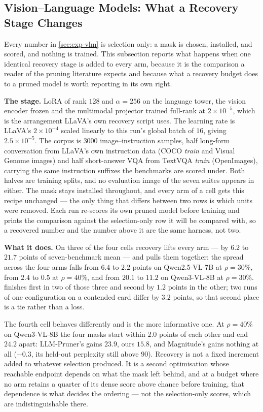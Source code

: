 \subsection{Vision--Language Models: What a Recovery Stage Changes}
\label{app:vlm-recovery}

Every number in \cref{sec:exp-vlm} is selection only: a mask is chosen, installed, and scored, and
nothing is trained. This subsection reports what happens when one identical recovery stage is added
to every arm, because it is the comparison a reader of the pruning literature expects and because
what a recovery budget does to a pruned model is worth reporting in its own right.

\textbf{The stage.} LoRA \citep{hu2022lora} of rank $128$ and $\alpha{=}256$ on the language tower, the vision encoder
frozen and the multimodal projector trained full-rank at $2\times10^{-5}$, which is the arrangement
LLaVA's own recovery script uses. The learning rate is LLaVA's $2\times10^{-4}$ scaled linearly to
this run's global batch of $16$, giving $2.5\times10^{-5}$. The corpus is $3000$ image--instruction
samples, half long-form conversation from LLaVA's own instruction data
\citep{liu2023llava} (COCO \emph{train} and Visual Genome images) and half short-answer VQA from
TextVQA \emph{train} \citep{singh2019textvqa} (OpenImages), carrying the same
instruction suffixes the benchmarks are scored under. Both halves are training splits, and no
evaluation image of the seven suites appears in either. The mask stays installed throughout, and every arm of
a cell gets this recipe unchanged --- the only thing that differs between two rows is which units
were removed. Each run re-scores its own pruned model before training and prints the comparison
against the selection-only row it will be compared with, so a recovered number and the number above
it are the same harness, not two.

\textbf{What it does.} On three of the four cells recovery lifts every arm --- by $6.2$ to $21.7$
points of seven-benchmark mean --- and pulls them together: the spread across the four arms falls
from $6.4$ to $2.2$ points on Qwen2.5-VL-7B at $\rho{=}30\%$, from $2.4$ to $0.5$ at $\rho{=}40\%$,
and from $20.1$ to $11.2$ on Qwen3-VL-8B at $\rho{=}30\%$. \method finishes first in two of those
three and second by $1.2$ points in the other; two runs of one configuration on a contended card
differ by $3.2$ points, so that second place is a tie rather than a loss.

The fourth cell behaves differently and is the more informative one. At $\rho{=}40\%$ on
Qwen3-VL-8B the four masks start within $2.0$ points of each other and end $24.2$ apart: LLM-Pruner's
gains $23.9$, ours $15.8$, and Magnitude's gains nothing at all ($-0.3$, its held-out perplexity
still above $90$). Recovery is not a fixed increment added to whatever selection produced. It is a
second optimisation whose reachable endpoint depends on what the mask left behind, and at a budget
where no arm retains a quarter of its dense score above chance before training, that dependence is
what decides the ordering --- not the selection-only scores, which are indistinguishable there.

